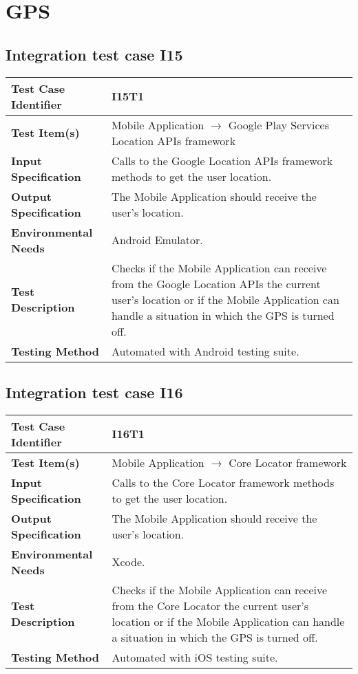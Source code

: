\section{GPS}
\subsection{Integration test case I15}

\begin{tabular}{l p{}}
    \hline
    \textbf{Test Case Identifier} & I15T1\\
    \hline
    \textbf{Test Item(s)} & Mobile Application $\rightarrow$ Google Play Services Location APIs framework\\
    \hline
    \textbf{Input Specification} & Calls to the Google Location APIs framework methods to get the user location.\\
    \hline
    \textbf{Output Specification} & The Mobile Application should receive the user’s location.\\
    \hline
    \textbf{Environmental Needs} & Android Emulator.\\
    \hline
    \textbf{Test Description} & Checks if the Mobile Application can receive from the Google Location APIs the current user’s location or if the Mobile Application can handle a situation in which the GPS is turned off. \\
    \hline
    \textbf{Testing Method} & Automated with Android testing suite.\\
    \hline
\end{tabular}

\subsection{Integration test case I16}

\begin{tabular}{l p{}}
    \hline
    \textbf{Test Case Identifier} & I16T1\\
    \hline
    \textbf{Test Item(s)} & Mobile Application $\rightarrow$ Core Locator framework\\
    \hline
    \textbf{Input Specification} & Calls to the Core Locator framework methods to get the user location.\\
    \hline
    \textbf{Output Specification} & The Mobile Application should receive the user’s location.\\
    \hline
    \textbf{Environmental Needs} & Xcode.\\
    \hline
    \textbf{Test Description} & Checks if the Mobile Application can receive from the Core Locator the current user’s location or if the Mobile Application can handle a situation in which the GPS is turned off. \\
    \hline
    \textbf{Testing Method} & Automated with iOS testing suite.\\
    \hline
\end{tabular}